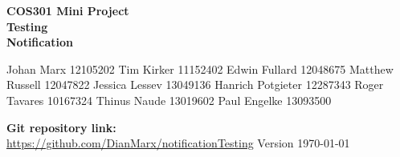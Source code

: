 \begin{titlepage}
	\begin{center}		
		\textbf{\LARGE COS301 Mini Project \\\textbf{Testing}\\}
		\vspace{1 cm}
		\LARGE{\textbf{Notification}}
			\begin{flushright} \large
				Johan Marx 12105202\newline
				Tim Kirker 11152402\newline
				Edwin Fullard 12048675\newline
				Matthew Russell 12047822\newline
				Jessica Lessev 13049136\newline		
				Hanrich Potgieter 12287343\newline
				Roger Tavares 10167324\newline
				Thinus Naude 13019602 \newline
				Paul Engelke 13093500\newline
			\end{flushright}
		\vfill
		\textbf{Git repository link:\\}
		\url{https://github.com/DianMarx/notificationTesting}
		\vfill
		{\LARGE Version}
		{\large \today}			
	\end{center}
\end{titlepage}
